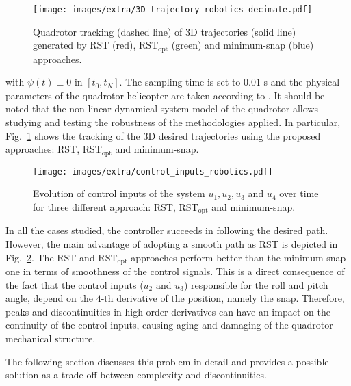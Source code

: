 \begin{figure}
\texttt{[image: images/extra/3D\_trajectory\_robotics\_decimate.pdf]}
\centering
\caption{Quadrotor tracking (dashed line) of 3D trajectories (solid line) generated by RST (red), RST$_{\text{opt}}$ (green) and minimum-snap (blue) approaches.}
\label{fig:rst_quadrator_curve}
\end{figure} 

with $\psi(t)\equiv 0$ in $[t_0,t_N]$. 
The sampling time is set to $0.01$ s and the physical parameters of the quadrotor helicopter are taken according to \cite{1570447}. It should be noted that the non-linear dynamical system model of the quadrotor allows studying and testing the robustness of the methodologies applied. In particular, Fig.~\ref{fig:rst_quadrator_curve} shows the tracking of the 3D desired trajectories using the proposed approaches: RST, RST$_{\text{opt}}$ and minimum-snap.

\begin{figure}
\texttt{[image: images/extra/control\_inputs\_robotics.pdf]}
\centering
\caption{Evolution of control inputs of the system $u_1, u_2, u_3$ and $u_4$ over time for three different approach: RST, RST$_{\text{opt}}$ and minimum-snap.}
\label{fig:rst_control_inputs}
\end{figure} 

In all the cases studied, the controller succeeds in following the desired path. However, the main advantage of adopting a smooth path as RST is depicted in Fig.~\ref{fig:rst_control_inputs}. The RST and RST$_{\text{opt}}$ approaches perform better than the minimum-snap one in terms of smoothness of the control signals. This is a direct consequence of the fact that the control inputs ($u_2$ and $u_3$) responsible for the roll and pitch angle, depend on the $4$-th derivative of the position, namely the snap. Therefore, peaks and discontinuities in high order derivatives can have an impact on the continuity of the control inputs, causing aging and damaging of the quadrotor mechanical structure. 

The following section discusses this problem in detail and provides a possible solution as a trade-off between complexity and discontinuities. 